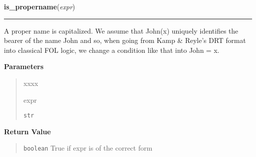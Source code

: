 \hspace{.8\funcindent}\begin{boxedminipage}{\funcwidth}

    \raggedright \textbf{is\_propername}(\textit{expr})

    \vspace{-1.5ex}

    \rule{\textwidth}{0.5\fboxrule}
\setlength{\parskip}{2ex}
    A proper name is capitalized. We assume that John(x) uniquely 
    identifies the bearer of the name John and so, when going from Kamp \& 
    Reyle's DRT format into classical FOL logic, we change a condition like
    that into John = x.

\setlength{\parskip}{1ex}
      \textbf{Parameters}
      \vspace{-1ex}

      \begin{quote}
        \begin{Ventry}{xxxx}

          \item[expr]

          \texttt{str}

        \end{Ventry}

      \end{quote}

      \textbf{Return Value}
    \vspace{-1ex}

      \begin{quote}
      \texttt{boolean} True if expr is of the correct form

      \end{quote}

    \end{boxedminipage}

    \label{temporaldrt:is_timevar}

    \vspace{0.5ex}

